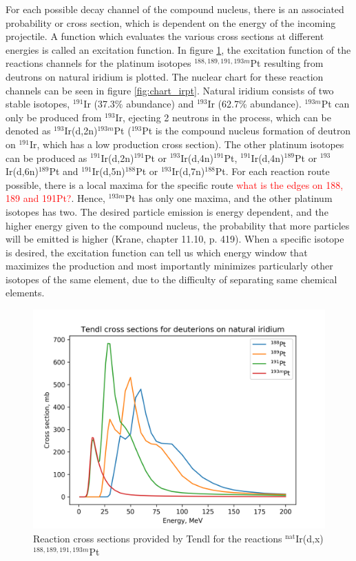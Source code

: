 \documentclass[a4paper,11pt,twoside]{book}
\begin{document}
\noindent For each possible decay channel of the compound nucleus, there is an associated probability or cross section, which is dependent on the energy of the incoming projectile. A function which evaluates the various cross sections at different energies is called an excitation function. In figure \ref{fig:pt_reactionchannels}, the excitation function of the reactions channels for the platinum isotopes $^{188, 189, 191,193m}$Pt resulting from deutrons on natural iridium is plotted. The nuclear chart for these reaction channels can be seen in figure \ref{fig:chart_irpt}. Natural iridium consists of two stable isotopes, $^{191}$Ir (37.3\% abundance) and $^{193}$Ir (62.7\% abundance). $^{193m}$Pt can only be produced from $^{193}$Ir, ejecting 2 neutrons in the process, which can be denoted as $^{193}$Ir(d,2n)$^{193m}$Pt ($^{193}$Pt is the compound nucleus formation of deutron on $^{191}$Ir, which has a low production cross section). The other platinum isotopes can be produced as $^{191}$Ir(d,2n)$^{191}$Pt or $^{193}$Ir(d,4n)$^{191}$Pt, $^{191}$Ir(d,4n)$^{189}$Pt or $^{193}$Ir(d,6n)$^{189}$Pt and $^{191}$Ir(d,5n)$^{188}$Pt or $^{193}$Ir(d,7n)$^{188}$Pt. For each reaction route possible, there is a local maxima for the specific route \textcolor{red}{what is the edges on 188, 189 and 191Pt?}. Hence, $^{193m}$Pt has only one maxima, and the other platinum isotopes has two. The desired particle emission is energy dependent, and the higher energy given to the compound nucleus, the probability that more particles will be emitted is higher (Krane, chapter 11.10, p. 419). When a specific isotope is desired, the excitation function can tell us which energy window that maximizes the production and most importantly minimizes particularly other isotopes of the same element, due to the difficulty of separating same chemical elements. \\


\begin{figure}
    \centering
    \includegraphics{Theory/reactionchannels_pt.png}
    \caption{Reaction cross sections provided by Tendl for the reactions $^\text{nat}$Ir(d,x)$^{188,189,191,193m}$Pt}
    \label{fig:pt_reactionchannels}
\end{figure}
\end{document}
